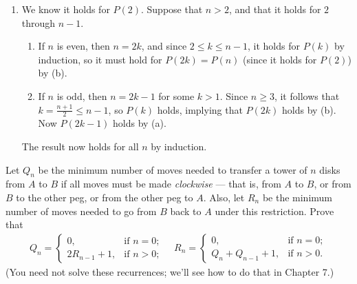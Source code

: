 \documentclass[12pt]{article}
\newenvironment{ex}[2][Exercise]{\begin{trivlist}
		\item[\hskip \labelsep {\bfseries #1}\hskip \labelsep {\bfseries #2.}]}{\end{trivlist}}
\newenvironment{sol}[1][Solution]{\begin{trivlist}
		\item[\hskip \labelsep {\bfseries #1:}]}{\end{trivlist}}
\begin{document}
\begin{sol}
\begin{enumerate}[label=(\alph*)]
\begin{proof}
		\end{proof}
		\item We know it holds for $P(2)$. Suppose that $n>2$, and that it holds for
		$2$ through $n-1$.
		\begin{enumerate}[label=(\roman*)]
			\item If $n$ is even, then $n=2k$, and since $2\leq k\leq n-1$,
			it holds for $P(k)$ by induction, so it must hold for $P(2k)=P(n)$ (since it holds
			for $P(2)$) by (b).
			\item If $n$ is odd, then $n=2k-1$ for some $k>1$. Since $n\geq 3$, it
			follows that $k=\frac{n+1}{2}\leq n-1$, so $P(k)$ holds, implying that $P(2k)$ holds
			by (b). Now $P(2k-1)$ holds by (a).
		\end{enumerate}
		The result now holds for all $n$ by induction.
	\end{enumerate}
\end{sol}

\begin{ex}{10}
	Let $Q_n$ be the minimum number of moves needed to transfer a tower of $n$ disks
	from $A$ to $B$ if all moves must be made \emph{clockwise} --- that is, from $A$
	to $B$, or from $B$ to the other peg, or from the other peg to $A$. Also, let
	$R_n$ be the minimum number of moves needed to go from $B$ back to $A$
	under this restriction. Prove that
	\begin{align*}
		Q_n=\begin{cases}
			0, & \text{if } n =0;\\
			2R_{n-1}+1, & \text{if } n>0;
		\end{cases}
		\quad
		R_n=\begin{cases}
			0, & \text{if } n =0;\\
			Q_n+Q_{n-1}+1, & \text{if } n>0.
		\end{cases}
	\end{align*}
	(You need not solve these recurrences; we'll see how to do that in Chapter 7.)
\end{ex}
\end{document}
